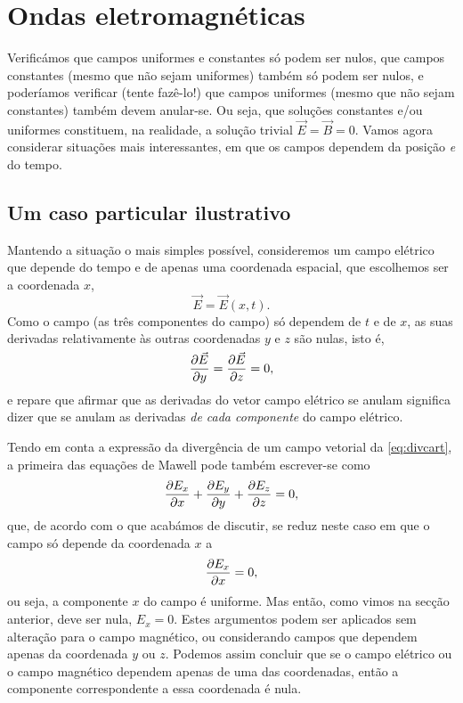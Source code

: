 \section{Ondas eletromagnéticas}
Verificámos que campos uniformes e constantes só podem ser nulos, que campos
constantes (mesmo que não sejam uniformes) também só podem ser nulos, e
poderíamos verificar (tente fazê\-\mbox{-lo}!) que campos uniformes (mesmo que não sejam
constantes) também devem anular-se. Ou seja, que soluções constantes e/ou
uniformes constituem, na realidade, a solução trivial $\vec E=\vec B=0$.
Vamos agora considerar situações mais interessantes, em que os campos dependem da
posição \emph{e} do tempo.

\subsection*{Um caso particular ilustrativo}
Mantendo a situação o mais simples possível, consideremos um campo elétrico que
depende do tempo e de apenas uma coordenada espacial, que escolhemos ser a
coordenada $x$,
\begin{equation*}
  \vec E=\vec E(x,t).
\end{equation*}
Como o campo (as três componentes do campo) só dependem de $t$ e de $x$, as suas
derivadas relativamente às outras coordenadas $y$ e $z$ são nulas, isto é,
\begin{align*}
  \pd{\vec E}{y}=\pd{\vec E}{z}=0,
\end{align*}
e repare que afirmar que as derivadas do vetor campo elétrico se anulam
significa dizer que se anulam as derivadas \emph{de cada componente} do campo
elétrico.

Tendo em conta a expressão da divergência de um campo vetorial da
\eqref{eq:divcart}, a primeira das equações de Mawell pode também escrever-se
como
\begin{equation*}
  \frac{\partial E_x}{\partial x}+\frac{\partial E_y}{\partial y}+\frac{\partial E_z}{\partial z}=0,
\end{equation*}
que, de acordo com o que acabámos de discutir, se reduz neste caso em que o
campo só depende da coordenada $x$ a
\begin{equation*}
  \frac{\partial E_x}{\partial x}=0,
\end{equation*}
ou seja, a componente $x$ do campo é uniforme. Mas então, como vimos na secção
anterior, deve ser nula, $E_x=0$. Estes argumentos podem ser aplicados sem
alteração para o campo magnético, ou considerando campos que dependem apenas da
coordenada $y$ ou $z$. Podemos assim concluir que se o campo elétrico ou o campo
magnético dependem apenas de uma das coordenadas, então a componente
correspondente a essa coordenada é nula.

